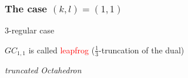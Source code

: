 \documentclass{beamer}
\begin{document}
\begin{frame}\frametitle{The case $(k,l)=(1,1)$}
\begin{center}
\begin{minipage}{4.6cm}
\centering
{}\par
$3$-regular case \par
$GC_{1,1}$ is called \textcolor{red}{leapfrog}
($\frac{1}{3}$-truncation of the dual)\par
{\em truncated Octahedron}
\end{minipage}
\begin{minipage}{4.6cm}
\centering
{}\par

\end{minipage}
\end{center}
\end{frame}
\end{document}
